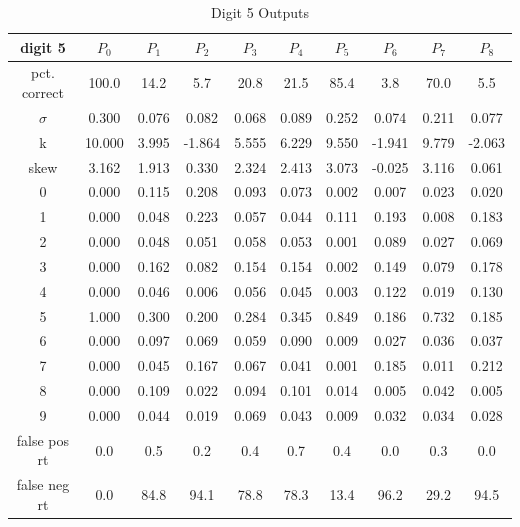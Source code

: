\documentclass[conference]{IEEEtran}
\begin{document}
\begin{table}
\caption{Digit 5 Outputs}
\centering
\begin{tabular}{ | c ||  c | c | c | c | c | c | c | c | c |}
 digit 5 & $P_0$ & $P_1$ & $P_2$ & $P_3$ & $P_4$ & $P_5$ & $P_6$ & $P_7$ & $P_8$ \\
\hline \hline
pct. correct  & 100.0 & 14.2 & 5.7 & 20.8 & 21.5 & 85.4 & 3.8 & 70.0 & 5.5 \\
\hline
$\sigma$ & 0.300& 0.076& 0.082& 0.068& 0.089& 0.252& 0.074& 0.211& 0.077 \\
\hline
k & 10.000& 3.995& -1.864& 5.555& 6.229& 9.550& -1.941& 9.779& -2.063 \\
\hline
skew & 3.162& 1.913& 0.330& 2.324& 2.413& 3.073& -0.025& 3.116& 0.061 \\
\hline
0 & 0.000 & 0.115 & 0.208 & 0.093 & 0.073 & 0.002 & 0.007 & 0.023 & 0.020 \\
\hline
1 & 0.000 & 0.048 & 0.223 & 0.057 & 0.044 & 0.111 & 0.193 & 0.008 & 0.183 \\
\hline
2 & 0.000 & 0.048 & 0.051 & 0.058 & 0.053 & 0.001 & 0.089 & 0.027 & 0.069 \\
\hline
3 & 0.000 & 0.162 & 0.082 & 0.154 & 0.154 & 0.002 & 0.149 & 0.079 & 0.178 \\
\hline
4 & 0.000 & 0.046 & 0.006 & 0.056 & 0.045 & 0.003 & 0.122 & 0.019 & 0.130 \\
\hline
5 & 1.000 & 0.300 & 0.200 & 0.284 & 0.345 & 0.849 & 0.186 & 0.732 & 0.185 \\
\hline
6 & 0.000 & 0.097 & 0.069 & 0.059 & 0.090 & 0.009 & 0.027 & 0.036 & 0.037 \\
\hline
7 & 0.000 & 0.045 & 0.167 & 0.067 & 0.041 & 0.001 & 0.185 & 0.011 & 0.212 \\
\hline
8 & 0.000 & 0.109 & 0.022 & 0.094 & 0.101 & 0.014 & 0.005 & 0.042 & 0.005 \\
\hline
9 & 0.000 & 0.044 & 0.019 & 0.069 & 0.043 & 0.009 & 0.032 & 0.034 & 0.028 \\
\hline
false pos rt & 0.0 & 0.5 & 0.2 & 0.4 & 0.7 & 0.4 & 0.0 & 0.3 & 0.0 \\
\hline
false neg rt & 0.0 & 84.8 & 94.1 & 78.8 & 78.3 & 13.4 & 96.2 & 29.2 & 94.5 \\
\hline
\end{tabular}
\end{table}
\end{document}
